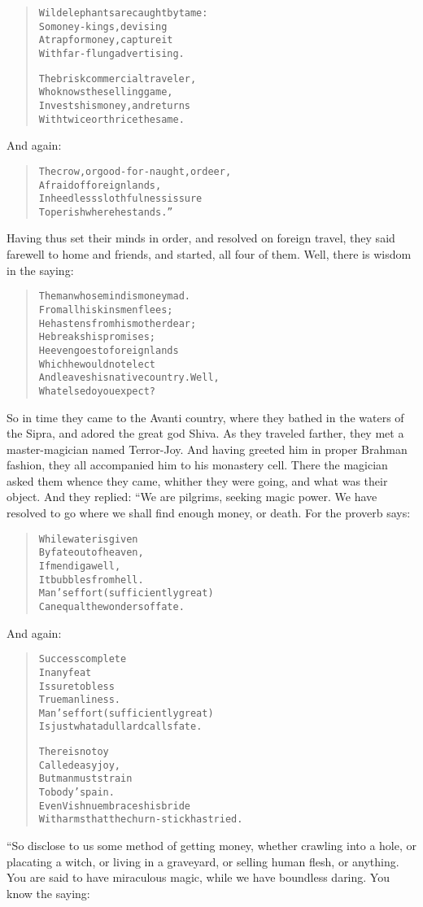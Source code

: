 \documentclass[article, twoside, 14pt]{memoir}
\renewenvironment{verbatim}{%
\begin{quote}%
\vskip -10pt%
\begin{alltt}\normalfont\large}{\end{alltt}%
\end{quote}%
\vskip -10pt
} %
\begin{document}
\begin{verbatim}
Wild elephants are caught by tame:
    So money-kings, devising
A trap for money, capture it
    With far-flung advertising.

The brisk commercial traveler,
    Who knows the selling game,
Invests his money, and returns
    With twice or thrice the same.
\end{verbatim}
And again:

\begin{verbatim}
The crow, or good-for-naught, or deer,
    Afraid of foreign lands,
In heedless slothfulness is sure
    To perish where he stands.”
\end{verbatim}
Having thus set their minds in order, and resolved on foreign
travel, they said farewell to home and friends, and started, all
four of them. Well, there is wisdom in the saying:

\begin{verbatim}
The man whose mind is money mad.
    From all his kinsmen flees;
He hastens from his mother dear;
    He breaks his promises;
He even goes to foreign lands
    Which he would not elect
And leaves his native country. Well,
    What else do you expect?
\end{verbatim}
So in time they came to the Avanti country, where they bathed in
the waters of the Sipra, and adored the great god Shiva. As they
traveled farther, they met a master-magician named Terror-Joy. And
having greeted him in proper Brahman fashion, they all accompanied
him to his monastery cell. There the magician asked them
whence they came, whither they were going, and what was their
object. And they replied: “We are pilgrims, seeking magic power. We
have resolved to go where we shall find enough money, or death. For
the proverb says:

\begin{verbatim}
While water is given
By fate out of heaven,
If men dig a well,
It bubbles from hell.
Man's effort (sufficiently great)
Can equal the wonders of fate.
\end{verbatim}
And again:

\begin{verbatim}
Success complete
In any feat
Is sure to bless
True manliness.
Man's effort (sufficiently great)
Is just what a dullard calls fate.

There is no toy
Called easy joy,
But man must strain
To body's pain.
Even Vishnu embraces his bride
With arms that the churn-stick has tried.
\end{verbatim}
“So disclose to us some method of getting money, whether crawling
into a hole, or placating a witch, or living in a graveyard, or
selling human flesh, or anything. You are said to have miraculous
magic, while we have boundless daring. You know the saying:
\end{document}
